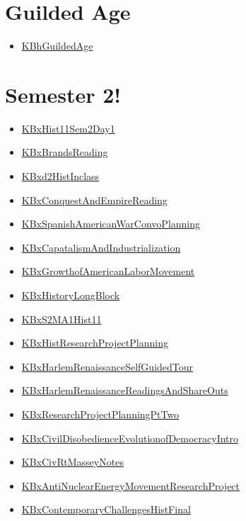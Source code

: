 \documentclass[letterpaper]{article}
\begin{document}
\section{Guilded Age}
\label{sec:org87ae932}
\begin{itemize}
\item \href{KBhGuildedAge.org}{KBhGuildedAge}
\end{itemize}

\section{Semester 2!}
\label{sec:orgbd5ccf4}
\begin{itemize}
\item \href{KBxHist11Sem2Day1.org}{KBxHist11Sem2Day1}
\item \href{KBxBrandsReading.org}{KBxBrandsReading}
\item \href{KBxd2HistInclass.org}{KBxd2HistInclass}
\item \href{KBxConquestAndEmpireReading.org}{KBxConquestAndEmpireReading}
\item \href{KBxSpanishAmericanWarConvoPlanning.org}{KBxSpanishAmericanWarConvoPlanning}
\item \href{KBxCapatalismAndIndustrialization.org}{KBxCapatalismAndIndustrialization}
\item \href{KBxGrowthofAmericanLaborMovement.org}{KBxGrowthofAmericanLaborMovement}
\item \href{KBxHistoryLongBlock.org}{KBxHistoryLongBlock}
\item \href{KBxS2MA1Hist11.org}{KBxS2MA1Hist11}
\item \href{KBxHistResearchProjectPlanning.org}{KBxHistResearchProjectPlanning}
\item \href{KBxHarlemRenaissanceSelfGuidedTour.org}{KBxHarlemRenaissanceSelfGuidedTour}
\item \href{KBxHarlemRenaissanceReadingsAndShareOuts.org}{KBxHarlemRenaissanceReadingsAndShareOuts}
\item \href{KBxResearchProjectPlanningPtTwo.org}{KBxResearchProjectPlanningPtTwo}
\item \href{KBxCivilDisobedienceEvolutionofDemocracyIntro.org}{KBxCivilDisobedienceEvolutionofDemocracyIntro}
\item \href{KBxCivRtMasseyNotes.org}{KBxCivRtMasseyNotes}
\item \href{KBxAntiNuclearEnergyMovementResearchProject.org}{KBxAntiNuclearEnergyMovementResearchProject}
\item \href{KBxContemporaryChallengesHistFinal.org}{KBxContemporaryChallengesHistFinal}
\end{itemize}
\end{document}
